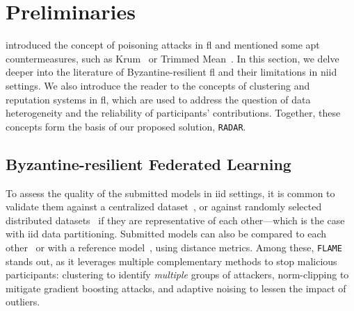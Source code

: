 \section{Preliminaries\label{sec:radar.prelim}}

 introduced the concept of poisoning attacks in \gls{fl} and mentioned some apt countermeasures, such as Krum~\cite{blanchard_Machinelearningadversaries_2017} or Trimmed Mean~\cite{yin_ByzantineRobustDistributedLearning_2018}.
In this section, we delve deeper into the literature of Byzantine-resilient \gls{fl} and their limitations in \gls{niid} settings.
We also introduce the reader to the concepts of clustering and reputation systems in \gls{fl}, which are used to address the question of data heterogeneity and the reliability of participants' contributions.
Together, these concepts form the basis of our proposed solution, \texttt{RADAR}.


\subsection{Byzantine-resilient Federated Learning\label{sec:radar.prelim.byzantine}}

To assess the quality of the submitted models in \gls{iid} settings, it is common to validate them against a centralized dataset~\cite{cao_FLTrustByzantinerobustFederated_2022}, or against randomly selected distributed datasets~\cite{pejo_QualityInferenceFederated_2023} if they are representative of each other---which is the case with \gls{iid} data partitioning.
Submitted models can also be compared to each other~\cite{blanchard_Machinelearningadversaries_2017,cao_FLTrustByzantinerobustFederated_2022,nguyen_FLAMETamingBackdoors_2022} or with a reference model~\cite{xia_ToFiAlgorithmDefend_2021,zhou_DifferentiallyPrivateFederated_2022}, using distance metrics.
Among these, \texttt{FLAME}~\cite{nguyen_FLAMETamingBackdoors_2022} stands out, as it leverages multiple complementary methods to stop malicious participants: clustering to identify \emph{multiple} groups of attackers, norm-clipping to mitigate gradient boosting attacks, and adaptive noising to lessen the impact of outliers.

